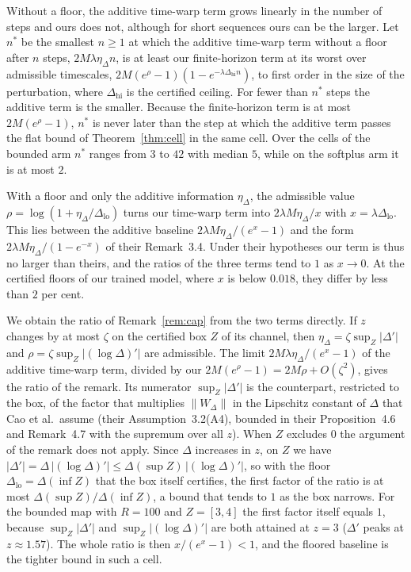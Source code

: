 \documentclass[11pt, a4paper]{article}
\theoremstyle{remark}
\theoremstyle{plain}
\begin{document}
Without a floor, the additive time-warp term grows linearly in the number of steps and ours does
not, although for short sequences ours can be the larger. Let $n^{\ast}$ be the smallest
$n \ge 1$ at which the additive time-warp term without a floor after $n$ steps,
$2M\lambda\eta_\Delta n$, is at least our finite-horizon term at its worst over admissible
timescales, $2M(e^{\rho} - 1)(1 - e^{-\lambda\Delta_{\mathrm{hi}} n})$, to first order in the
size of the perturbation, where $\Delta_{\mathrm{hi}}$ is the certified ceiling. For fewer than
$n^{\ast}$ steps the additive term is the smaller. Because the finite-horizon term is at most
$2M(e^{\rho} - 1)$, $n^{\ast}$ is never later than the step at which the additive term passes the
flat bound of Theorem~\ref{thm:cell} in the same cell. Over the cells of the bounded arm
$n^{\ast}$ ranges from $3$ to $42$ with median $5$, while on the softplus arm it is at most $2$.

With a floor and only the additive information $\eta_\Delta$, the admissible value
$\rho = \log(1 + \eta_\Delta/\Delta_{\mathrm{lo}})$ turns our time-warp term into
$2\lambda M\eta_\Delta/x$ with $x = \lambda\Delta_{\mathrm{lo}}$. This lies between the additive
baseline $2\lambda M\eta_\Delta/(e^{x} - 1)$ and the form $2\lambda M\eta_\Delta/(1 - e^{-x})$ of
their Remark~3.4.
Under their hypotheses our term is thus no larger than theirs, and the ratios of the three terms
tend to $1$ as $x \to 0$. At
the certified floors of our trained model, where $x$ is below $0.018$, they differ by less than $2$
per cent.

We obtain the ratio of Remark~\ref{rem:cap} from the two terms directly. If $z$ changes by at most
$\zeta$ on the certified box $Z$ of its channel, then $\eta_\Delta = \zeta\sup_Z|\Delta'|$ and
$\rho = \zeta\sup_Z|(\log\Delta)'|$ are admissible. The limit $2M\lambda\eta_\Delta/(e^{x} - 1)$ of
the additive time-warp term, divided by our $2M(e^{\rho} - 1) = 2M\rho + O(\zeta^2)$, gives the
ratio of the remark. Its numerator $\sup_Z|\Delta'|$ is the counterpart, restricted to the box,
of the factor that multiplies $\|W_\Delta\|$ in the Lipschitz constant of $\Delta$ that Cao et al.\
assume (their Assumption~3.2(A4), bounded in their Proposition~4.6 and Remark~4.7 with the
supremum over all $z$). When $Z$ excludes $0$ the argument of the remark does not apply. Since $\Delta$ increases in $z$, on $Z$ we have
$|\Delta'| = \Delta\,|(\log\Delta)'| \le \Delta(\sup Z)\,|(\log\Delta)'|$, so with the floor
$\Delta_{\mathrm{lo}} = \Delta(\inf Z)$ that the box itself certifies, the first factor of the
ratio is at most $\Delta(\sup Z)/\Delta(\inf Z)$, a bound that tends to $1$ as the box narrows. For
the bounded map with $R = 100$ and $Z = [3, 4]$ the first factor itself equals $1$, because
$\sup_Z|\Delta'|$ and $\sup_Z|(\log\Delta)'|$ are both attained at $z = 3$ ($\Delta'$ peaks at
$z \approx 1.57$). The whole ratio is then
$x/(e^{x} - 1) < 1$, and the floored baseline is the tighter bound in such a cell.
\end{document}
